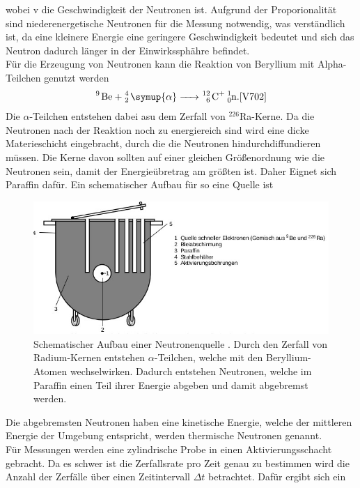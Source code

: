 wobei v die Geschwindigkeit der Neutronen ist.
Aufgrund der Proporionalität sind niederenergetische Neutronen für die Messung notwendig,
was verständlich ist, da eine kleinere Energie eine geringere Geschwindigkeit bedeutet
und sich das Neutron dadurch länger in der Einwirkssphähre befindet.\\
Für die Erzeugung von Neutronen kann die Reaktion von Beryllium mit 
Alpha-Teilchen genutzt werden
\begin{align}
    \ce{ ^9 Be + _2^4 \symup{\alpha} -> _6^{12} C+ _0^1n }. \text{\cite{V702}} \label{eq:4}
\end{align}
Die $\alpha$-Teilchen entstehen dabei asu dem Zerfall von $^{226} $Ra-Kerne.
Da die Neutronen nach der Reaktion noch zu energiereich sind wird eine dicke Materieschicht eingebracht,
durch die die Neutronen hindurchdiffundieren müssen. Die Kerne davon sollten auf
einer gleichen Größenordnung wie die Neutronen sein, damit der Energieübretrag am größten ist.
Daher Eignet sich Paraffin dafür. Ein schematischer Aufbau für so eine Quelle ist
\begin{figure}
    \centering
    \includegraphics[width=\linewidth]{images/neutron_quelle.jpg}
    \caption{Schematischer Aufbau einer Neutronenquelle \cite{V702}.
    Durch den Zerfall von Radium-Kernen entstehen $\alpha$-Teilchen,
    welche mit den Beryllium-Atomen wechselwirken. Dadurch entstehen Neutronen,
    welche im Paraffin einen Teil ihrer Energie abgeben und damit abgebremst werden.
    }
    \label{fig:1}
\end{figure}
Die abgebremsten Neutronen haben eine kinetische Energie, welche der mittleren Energie der Umgebung entspricht,
werden thermische Neutronen genannt.\\
Für Messungen werden eine zylindrische Probe in einen Aktivierungsschacht gebracht.
Da es schwer ist die Zerfallsrate pro Zeit genau zu bestimmen wird die Anzahl der 
Zerfälle über einen Zeitintervall $\Delta t$ betrachtet. Dafür ergibt sich ein
